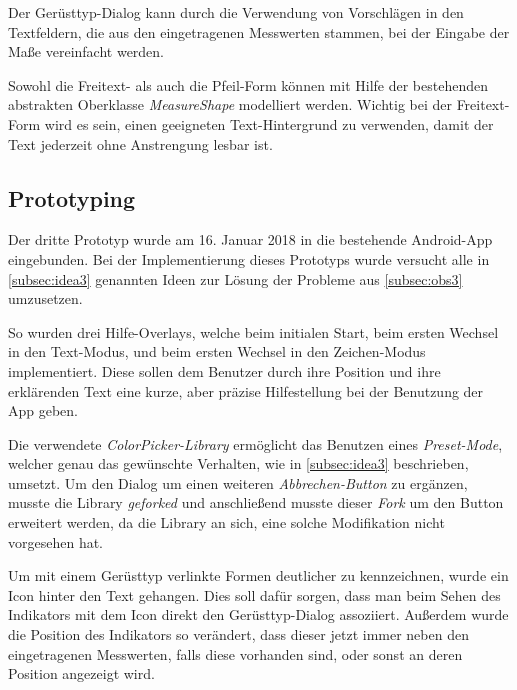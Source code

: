 Der Gerüsttyp-Dialog kann durch die Verwendung von Vorschlägen in den Textfeldern, die aus den eingetragenen Messwerten stammen, bei der Eingabe der Maße vereinfacht werden. \\

Sowohl die Freitext- als auch die Pfeil-Form können mit Hilfe der bestehenden abstrakten Oberklasse \emph{MeasureShape} modelliert werden.
Wichtig bei der Freitext-Form wird es sein, einen geeigneten Text-Hintergrund zu verwenden, damit der Text jederzeit ohne Anstrengung lesbar ist.

\subsection{Prototyping}
Der dritte Prototyp wurde am 16. Januar 2018 in die bestehende Android-App eingebunden.
Bei der Implementierung dieses Prototyps wurde versucht alle in \autoref{subsec:idea3} genannten Ideen zur Lösung der Probleme aus \autoref{subsec:obs3} umzusetzen.

So wurden drei Hilfe-Overlays, welche beim initialen Start, beim ersten Wechsel in den Text-Modus, und beim ersten Wechsel in den Zeichen-Modus implementiert.
Diese sollen dem Benutzer durch ihre Position und ihre erklärenden Text eine kurze, aber präzise Hilfestellung bei der Benutzung der App geben.

Die verwendete \emph{ColorPicker-Library} ermöglicht das Benutzen eines \emph{Preset-Mode}, welcher genau das gewünschte Verhalten, wie in \autoref{subsec:idea3} beschrieben, umsetzt.
Um den Dialog um einen weiteren \emph{Abbrechen-Button} zu ergänzen, musste die Library \emph{geforked} und anschließend musste dieser \emph{Fork} um den Button erweitert werden, da die Library an sich, eine solche Modifikation nicht vorgesehen hat. 

Um mit einem Gerüsttyp verlinkte Formen deutlicher zu kennzeichnen, wurde ein Icon  hinter den Text gehangen.
Dies soll dafür sorgen, dass man beim Sehen des Indikators mit dem Icon direkt den Gerüsttyp-Dialog assoziiert.
Außerdem wurde die Position des Indikators so verändert, dass dieser jetzt immer neben den eingetragenen Messwerten, falls diese vorhanden sind, oder sonst an deren Position angezeigt wird. \\

